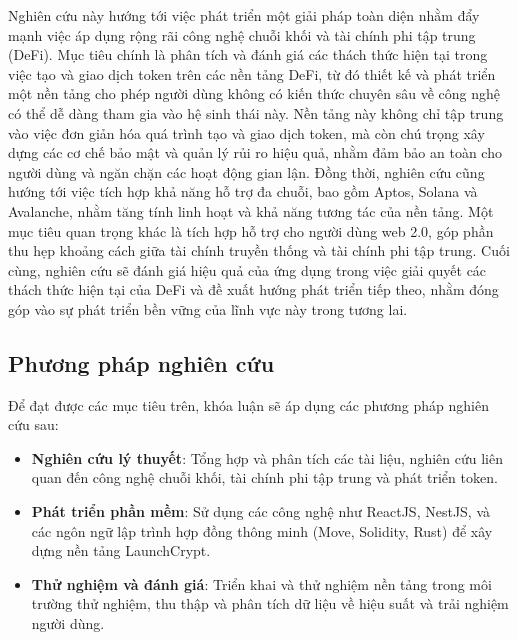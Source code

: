 \hspace{\parindent}Nghiên cứu này hướng tới việc phát triển một giải pháp toàn
diện nhằm đẩy mạnh việc áp dụng rộng rãi công nghệ chuỗi khối và tài chính phi tập trung (DeFi).
Mục tiêu chính là phân tích và đánh giá các thách thức hiện tại trong việc tạo và giao
dịch token trên các nền tảng DeFi, từ đó thiết kế và phát triển một nền tảng
cho phép người dùng không có kiến thức chuyên sâu về công nghệ có thể dễ dàng
tham gia vào hệ sinh thái này. Nền tảng này không chỉ tập trung vào việc đơn
giản hóa quá trình tạo và giao dịch token, mà còn chú trọng xây dựng các cơ chế
bảo mật và quản lý rủi ro hiệu quả, nhằm đảm bảo an toàn cho người dùng và ngăn
chặn các hoạt động gian lận. Đồng thời, nghiên cứu cũng hướng tới việc tích hợp
khả năng hỗ trợ đa chuỗi, bao gồm Aptos, Solana và Avalanche, nhằm tăng tính
linh hoạt và khả năng tương tác của nền tảng. Một mục tiêu quan trọng khác là
tích hợp hỗ trợ cho người dùng web 2.0, góp phần thu hẹp khoảng cách giữa tài
chính truyền thống và tài chính phi tập trung. Cuối cùng, nghiên cứu sẽ đánh
giá hiệu quả của ứng dụng trong việc giải quyết các thách thức hiện tại của
DeFi và đề xuất hướng phát triển tiếp theo, nhằm đóng góp vào sự phát triển bền
vững của lĩnh vực này trong tương lai.

\subsection*{Phương pháp nghiên cứu}
Để đạt được các mục tiêu trên, khóa luận sẽ áp dụng các phương pháp nghiên cứu
sau:
\begin{itemize}
  \item \textbf{Nghiên cứu lý thuyết}: Tổng hợp và phân tích các tài liệu,
        nghiên cứu liên quan đến công nghệ chuỗi khối, tài chính phi tập trung và phát triển token.

  \item \textbf{Phát triển phần mềm}: Sử dụng các công nghệ như ReactJS,
        NestJS, và các ngôn ngữ lập trình hợp đồng thông minh (Move, Solidity, Rust) để xây
        dựng nền tảng LaunchCrypt.

  \item \textbf{Thử nghiệm và đánh giá}: Triển khai và thử nghiệm nền tảng
        trong môi trường thử nghiệm, thu thập và phân tích dữ liệu về hiệu suất và trải
        nghiệm người dùng.
\end{itemize}

